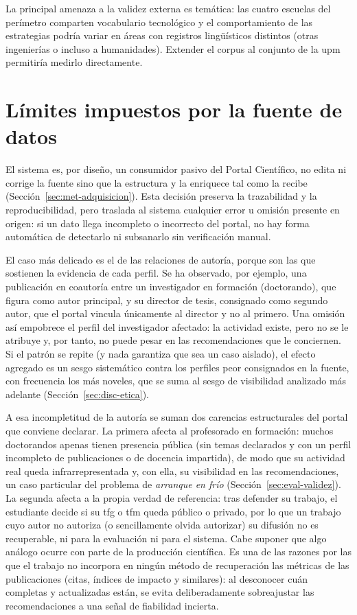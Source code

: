La principal amenaza a la validez externa es temática: las cuatro escuelas del perímetro comparten vocabulario tecnológico y el comportamiento de las estrategias podría variar en áreas con registros lingüísticos distintos (otras ingenierías o incluso a humanidades).
Extender el corpus al conjunto de la \gls{upm} permitiría medirlo directamente.

\section{Límites impuestos por la fuente de datos}
\label{sec:disc-fuente}

El sistema es, por diseño, un consumidor pasivo del Portal Científico, no edita ni corrige la fuente sino que la estructura y la enriquece tal como la recibe (Sección~\ref{sec:met-adquisicion}).
Esta decisión preserva la trazabilidad y la reproducibilidad, pero traslada al sistema cualquier error u omisión presente en origen: si un dato llega incompleto o incorrecto del portal, no hay forma automática de detectarlo ni subsanarlo sin verificación manual.

El caso más delicado es el de las relaciones de autoría, porque son las que sostienen la evidencia de cada perfil.
Se ha observado, por ejemplo, una publicación en coautoría entre un investigador en formación (doctorando), que figura como autor principal, y su director de tesis, consignado como segundo autor, que el portal vincula únicamente al director y no al primero.
Una omisión así empobrece el perfil del investigador afectado: la actividad existe, pero no se le atribuye y, por tanto, no puede pesar en las recomendaciones que le conciernen.
Si el patrón se repite (y nada garantiza que sea un caso aislado), el efecto agregado es un sesgo sistemático contra los perfiles peor consignados en la fuente, con frecuencia los más noveles, que se suma al sesgo de visibilidad analizado más adelante (Sección~\ref{sec:disc-etica}).

A esa incompletitud de la autoría se suman dos carencias estructurales del portal que conviene declarar.
La primera afecta al profesorado en formación: muchos doctorandos apenas tienen presencia pública (sin temas declarados y con un perfil incompleto de publicaciones o de docencia impartida), de modo que su actividad real queda infrarrepresentada y, con ella, su visibilidad en las recomendaciones, un caso particular del problema de \emph{arranque en frío} (Sección~\ref{sec:eval-validez}).
La segunda afecta a la propia verdad de referencia: tras defender su trabajo, el estudiante decide si su \gls{tfg} o \gls{tfm} queda público o privado, por lo que un trabajo cuyo autor no autoriza (o sencillamente olvida autorizar) su difusión no es recuperable, ni para la evaluación ni para el sistema.
Cabe suponer que algo análogo ocurre con parte de la producción científica.
Es una de las razones por las que el trabajo no incorpora en ningún método de recuperación las métricas de las publicaciones (citas, índices de impacto y similares): al desconocer cuán completas y actualizadas están, se evita deliberadamente sobreajustar las recomendaciones a una señal de fiabilidad incierta.

